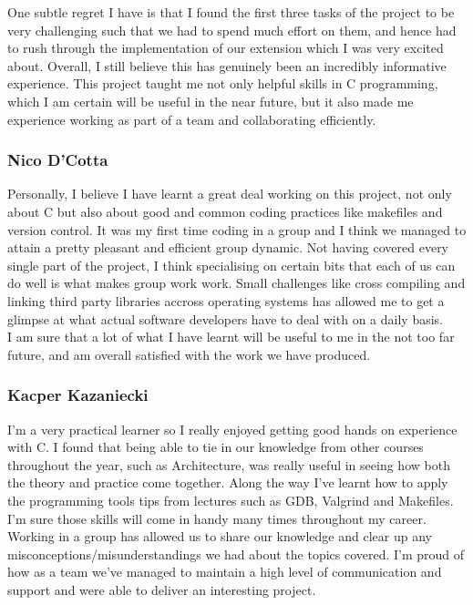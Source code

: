 \documentclass[11pt]{article}
\begin{document}
One subtle regret I have is that I found the first three tasks of the project to be very 
challenging such that we had to spend much effort on them, and hence had to rush through the 
implementation of our extension which I was very excited about. Overall, I still believe this has 
genuinely been an incredibly informative experience. This project taught me not only helpful skills in 
C programming, which I am certain will be useful in the near future, but it also made me experience 
working as part of a team and collaborating efficiently.\\

\subsubsection{Nico D'Cotta}
Personally, I believe I have learnt a great deal working on this project, not
only about C but also about good and common coding practices like makefiles and
version control.
It was my first time coding in a group and I think we managed to attain a pretty
pleasant and efficient group dynamic. Not having covered every single part of
the project, I think specialising on certain bits that each of us can do well is
what makes group work work. Small challenges like cross compiling and linking
third party libraries accross operating systems has allowed me to get a glimpse
at what actual software developers have to deal with on a daily basis.\\

I am sure that a lot of what I have learnt will be useful to me in the not too
far future, and am overall satisfied with the work we have produced.\\


\subsubsection{Kacper Kazaniecki}
I'm a very practical learner so I really enjoyed getting good hands on experience with C. 
I found that being able to tie in our knowledge from other courses throughout the year, 
such as Architecture, was really useful in seeing how both the theory and practice come together. 
Along the way I've learnt how to apply the programming tools tips from lectures such as GDB, Valgrind and Makefiles. 
I'm sure those skills will come in handy many times throughout my career. Working in a group has allowed us to share our 
knowledge and clear up any misconceptions/misunderstandings we had about the topics covered. I'm proud of how as a team 
we've managed to maintain a high level of communication and support and were able to deliver an interesting project.\\
\end{document}
